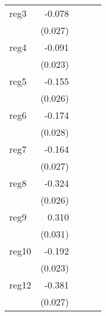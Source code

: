{\begin{longtable}{l*{4}{D{.}{.}{-1}}}
\addlinespace
reg3        &      -0.078\sym{**} &                     &                     &                     \\
            &     (0.027)         &                     &                     &                     \\
\addlinespace
reg4        &      -0.091\sym{***}&                     &                     &                     \\
            &     (0.023)         &                     &                     &                     \\
\addlinespace
reg5        &      -0.155\sym{***}&                     &                     &                     \\
            &     (0.026)         &                     &                     &                     \\
\addlinespace
reg6        &      -0.174\sym{***}&                     &                     &                     \\
            &     (0.028)         &                     &                     &                     \\
\addlinespace
reg7        &      -0.164\sym{***}&                     &                     &                     \\
            &     (0.027)         &                     &                     &                     \\
\addlinespace
reg8        &      -0.324\sym{***}&                     &                     &                     \\
            &     (0.026)         &                     &                     &                     \\
\addlinespace
reg9        &       0.310\sym{***}&                     &                     &                     \\
            &     (0.031)         &                     &                     &                     \\
\addlinespace
reg10       &      -0.192\sym{***}&                     &                     &                     \\
            &     (0.023)         &                     &                     &                     \\
\addlinespace
reg12       &      -0.381\sym{***}&                     &                     &                     \\
            &     (0.027)         &                     &                     &                     \\

\end{longtable}}
